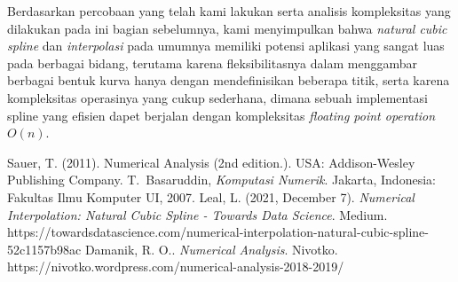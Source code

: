 \documentclass[journal,12pt,onecolumn,a4paper]{IEEEtran}
\begin{document}
Berdasarkan percobaan yang telah kami lakukan serta analisis kompleksitas yang dilakukan pada ini bagian sebelumnya, kami menyimpulkan bahwa \emph{natural cubic spline} dan \emph{interpolasi} pada umumnya memiliki potensi aplikasi yang sangat luas pada berbagai bidang, terutama karena fleksibilitasnya dalam menggambar berbagai bentuk kurva hanya dengan mendefinisikan beberapa titik, serta karena kompleksitas operasinya yang cukup sederhana, dimana sebuah implementasi spline yang efisien dapet berjalan dengan kompleksitas \emph{floating point operation} \(O(n)\).




\begin{thebibliography}{1}
	 Sauer, T. (2011). Numerical Analysis (2nd edition.). USA: Addison-Wesley Publishing Company.
	T.~Basaruddin, \emph{Komputasi Numerik}. Jakarta, Indonesia: Fakultas Ilmu Komputer UI, 2007.
	Leal, L. (2021, December 7). \emph{Numerical Interpolation: Natural Cubic Spline - Towards Data Science}. Medium. https://towardsdatascience.com/numerical-interpolation-natural-cubic-spline-52c1157b98ac
	Damanik, R. O.. \emph{Numerical Analysis}. Nivotko. https://nivotko.wordpress.com/numerical-analysis-2018-2019/
\end{thebibliography}

\end{document}
